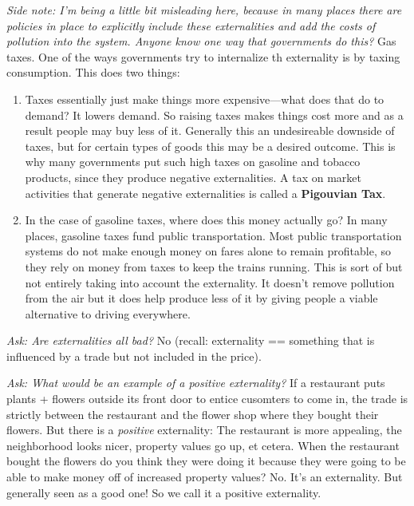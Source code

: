 \documentclass[11pt]{article}
\begin{document}

{\it Side note: I'm being a little bit misleading here, because in many places there are policies in place to explicitly include these externalities and add the costs of pollution into the system. Anyone know one way that governments do this?} Gas taxes. One of the ways governments try to internalize th externality is by taxing consumption. This does two things: 
\begin{enumerate}
    \item Taxes essentially just make things more expensive---what does that do to demand? It lowers demand. So raising taxes makes things cost more and as a result people may buy less of it. Generally this an undesireable downside of taxes, but for certain types of goods this may be a desired outcome. This is why many governments put such high taxes on gasoline and tobacco products, since they produce negative externalities. A tax on market activities that generate negative externalities is called a {\bf Pigouvian Tax}.
    \item In the case of gasoline taxes, where does this money actually go? In many places, gasoline taxes fund public transportation. Most public transportation systems do not make enough money on fares alone to remain profitable, so they rely on money from taxes to keep the trains running. This is sort of but not entirely taking into account the externality. It doesn't remove pollution from the air but it does help produce less of it by giving people a viable alternative to driving everywhere.
\end{enumerate}

{\it Ask: Are externalities all bad?} No (recall: externality == something that is influenced by a trade but not included in the price).

{\it Ask: What would be an example of a positive externality?} If a restaurant puts plants + flowers outside its front door to entice cusomters to come in, the trade is strictly between the restaurant and the flower shop where they bought their flowers. But there is a {\it positive} externality: The restaurant is more appealing, the neighborhood looks nicer, property values go up, et cetera. When the restaurant bought the flowers do you think they were doing it because they were going to be able to make money off of increased property values? No. It's an externality. But generally seen as a good one! So we call it a positive externality.
\end{document}

